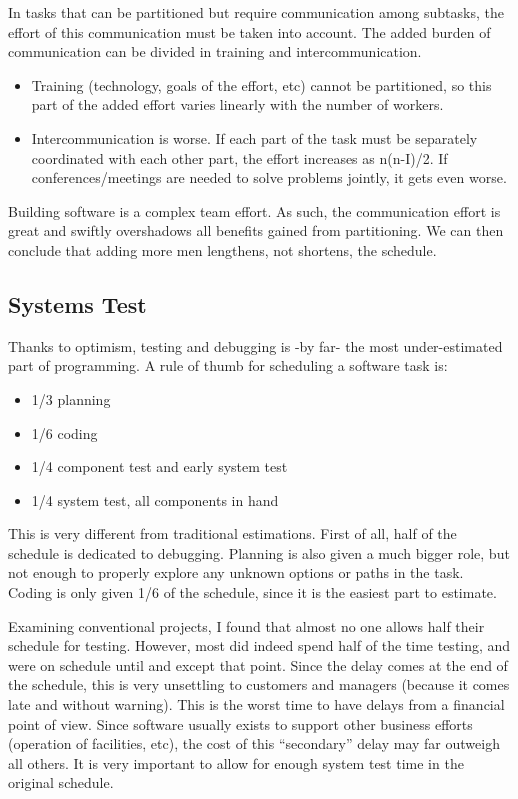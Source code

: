 \documentclass[letterpaper,12pt,parskip=full]{article}
\begin{document}
In tasks that can be partitioned but require communication among subtasks, the effort of this communication must be taken into account. The added burden of communication can be divided in training and intercommunication.

\begin{itemize}
    \item Training (technology, goals of the effort, etc) cannot be partitioned, so this part of the added effort varies linearly with the number of workers.
    \item Intercommunication is worse. If each part of the task must be separately coordinated with each other part, the effort increases as n(n-I)/2. If conferences/meetings are needed to solve problems jointly, it gets even worse.
\end{itemize}

Building software is a complex team effort. As such, the communication effort is great and swiftly overshadows all benefits gained from partitioning. We can then conclude that adding more men lengthens, not shortens, the schedule.

\subsection{Systems Test}

Thanks to optimism, testing and debugging is -by far- the most under-estimated part of programming. A rule of thumb for scheduling a software task is:

\begin{itemize}
    \item 1/3 planning
    \item 1/6 coding
    \item 1/4 component test and early system test
    \item 1/4 system test, all components in hand
\end{itemize}

This is very different from traditional estimations. First of all, half of the schedule is dedicated to debugging. Planning is also given a much bigger role, but not enough to properly explore any unknown options or paths in the task. Coding is only given 1/6 of the schedule, since it is the easiest part to estimate.

Examining conventional projects, I found that almost no one allows half their schedule for testing. However, most did indeed spend half of the time testing, and were on schedule until and except that point. Since the delay comes at the end of the schedule, this is very unsettling to customers and managers (because it comes late and without warning). This is the worst time to have delays from a financial point of view. Since software usually exists to support other business efforts (operation of facilities, etc), the cost of this “secondary” delay may far outweigh all others. It is very important to allow for enough system test time in the original schedule.
\end{document}
